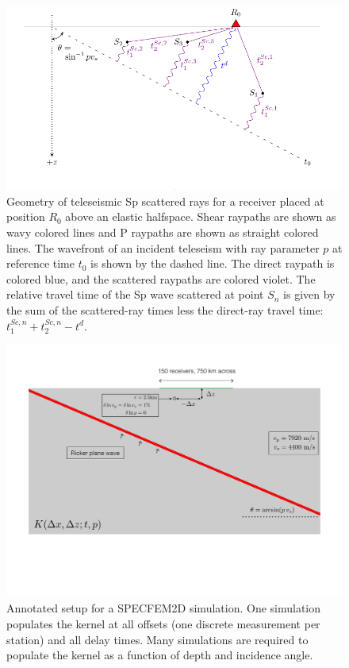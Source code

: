 \documentclass[referee]{gji}
\begin{document}
\begin{figure}
\centering
\includegraphics[]{img/RayCartoon.pdf}
\caption{Geometry of teleseismic Sp scattered rays for a receiver placed at position $R_0$ above an elastic halfspace.  Shear raypaths are shown as wavy colored lines and P raypaths are shown as straight colored lines.  The wavefront of an incident teleseism with ray parameter $p$ at reference time $t_0$ is shown by the dashed line.  The direct raypath is colored blue, and the scattered raypaths are colored violet.  The relative travel time of the Sp wave scattered at point $S_n$ is given by the sum of the scattered-ray times less the direct-ray travel time: $t_1^{Sc,n} + t_2^{Sc,n} - t^d$.}
\label{fig:RayCartoon}
\end{figure}

\begin{figure}
\centering
\includegraphics[scale=0.5]{img/Figure2.pdf}
\caption{Annotated setup for a SPECFEM2D simulation.  One simulation populates the kernel at all offsets (one discrete measurement per station) and all delay times.  Many simulations are required to populate the kernel as a function of depth and incidence angle.}
\label{fig:ModelSetup}
\end{figure}
\end{document}
